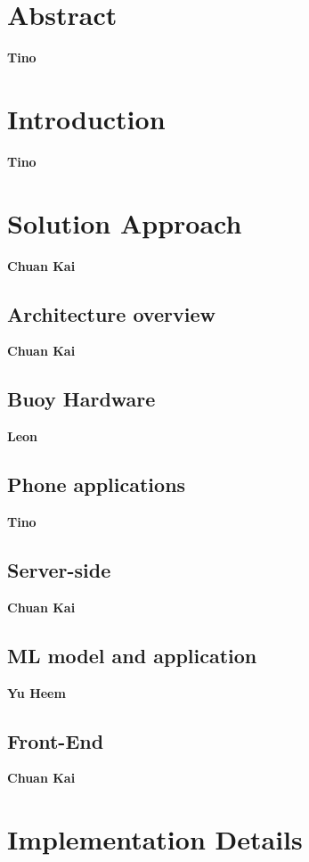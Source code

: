 \documentclass{article}
\begin{document}
\section{Abstract}

\textbf{Tino}

\section{Introduction}

\textbf{Tino}

\section{Solution Approach}

\textbf{Chuan Kai}

\subsection{Architecture overview}

\textbf{Chuan Kai}

\subsection{Buoy Hardware}

\textbf{Leon}

\subsection{Phone applications}

\textbf{Tino}

\subsection{Server-side}

\textbf{Chuan Kai}

\subsection{ML model and application}

\textbf{Yu Heem}

\subsection{Front-End}

\textbf{Chuan Kai}

\section{Implementation Details}
\end{document}
